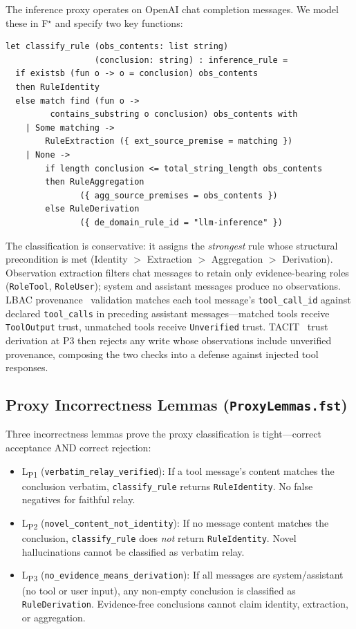 \documentclass[sigplan,screen,nonacm]{acmart}
\newcommand{\fstar}{F\ensuremath{^\star}}
\begin{document}
The inference proxy operates on OpenAI chat completion messages. We model
these in \fstar{} and specify two key functions:

\begin{lstlisting}[language=fstar,caption={Automatic inference rule classification at the model serving boundary.},label={lst:classify}]
let classify_rule (obs_contents: list string)
                  (conclusion: string) : inference_rule =
  if existsb (fun o -> o = conclusion) obs_contents
  then RuleIdentity
  else match find (fun o ->
         contains_substring o conclusion) obs_contents with
    | Some matching ->
        RuleExtraction ({ ext_source_premise = matching })
    | None ->
        if length conclusion <= total_string_length obs_contents
        then RuleAggregation
               ({ agg_source_premises = obs_contents })
        else RuleDerivation
               ({ de_domain_rule_id = "llm-inference" })
\end{lstlisting}

The classification is conservative: it assigns the \emph{strongest} rule
whose structural precondition is met (Identity $>$ Extraction $>$
Aggregation $>$ Derivation). Observation extraction filters chat messages to
retain only evidence-bearing roles (\texttt{RoleTool}, \texttt{RoleUser});
system and assistant messages produce no observations. LBAC
provenance~\cite{zhou2026lbac} validation matches each tool message's
\texttt{tool\_call\_id} against declared \texttt{tool\_calls} in preceding
assistant messages---matched tools receive \texttt{ToolOutput} trust,
unmatched tools receive \texttt{Unverified} trust. TACIT~\cite{odersky2026tacit}
trust derivation at P3 then rejects any write whose observations include
unverified provenance, composing the two checks into a defense against
injected tool responses.

\subsection{Proxy Incorrectness Lemmas (\texttt{ProxyLemmas.fst})}
\label{sec:proxy-lemmas}

Three incorrectness lemmas prove the proxy classification is tight---correct
acceptance AND correct rejection:

\begin{itemize}
  \item L\textsubscript{P1} (\texttt{verbatim\_relay\_verified}): If a tool
    message's content matches the conclusion verbatim, \texttt{classify\_rule}
    returns \texttt{RuleIdentity}. No false negatives for faithful relay.
  \item L\textsubscript{P2} (\texttt{novel\_content\_not\_identity}): If no
    message content matches the conclusion, \texttt{classify\_rule} does
    \emph{not} return \texttt{RuleIdentity}. Novel hallucinations cannot be
    classified as verbatim relay.
  \item L\textsubscript{P3} (\texttt{no\_evidence\_means\_derivation}): If all
    messages are system/assistant (no tool or user input), any non-empty
    conclusion is classified as \texttt{RuleDerivation}. Evidence-free
    conclusions cannot claim identity, extraction, or aggregation.
\end{itemize}
\end{document}
